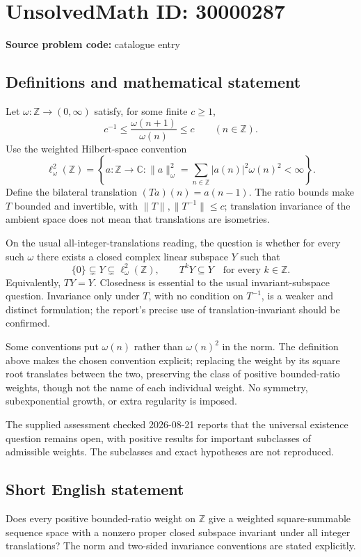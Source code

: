 \documentclass[11pt]{article}
\newcommand{\Z}{\mathbb{Z}}
\newcommand{\C}{\mathbb{C}}
\begin{document}
\section*{UnsolvedMath ID: 30000287}
\textbf{Source problem code:} catalogue entry
\subsection{Definitions and mathematical statement}
Let \(\omega:\Z\to(0,\infty)\) satisfy, for some finite \(c\geq1\),
\[
c^{-1}\leq\frac{\omega(n+1)}{\omega(n)}\leq c\qquad(n\in\Z).
\]
Use the weighted Hilbert-space convention
\[
\ell^2_\omega(\Z)=\left\{a:\Z\to\C:\|a\|_\omega^2=\sum_{n\in\Z}|a(n)|^2\omega(n)^2<\infty\right\}.
\]
Define the bilateral translation \((Ta)(n)=a(n-1)\). The ratio bounds make \(T\) bounded and invertible, with \(\|T\|,\|T^{-1}\|\leq c\); translation invariance of the ambient space does not mean that translations are isometries.

On the usual all-integer-translations reading, the question is whether for every such \(\omega\) there exists a closed complex linear subspace \(Y\) such that
\[
\{0\}\subsetneq Y\subsetneq\ell^2_\omega(\Z),\qquad
T^kY\subseteq Y\quad\text{for every }k\in\Z.
\]
Equivalently, \(TY=Y\). Closedness is essential to the usual invariant-subspace question. Invariance only under \(T\), with no condition on \(T^{-1}\), is a weaker and distinct formulation; the report's precise use of translation-invariant should be confirmed.

Some conventions put \(\omega(n)\) rather than \(\omega(n)^2\) in the norm. The definition above makes the chosen convention explicit; replacing the weight by its square root translates between the two, preserving the class of positive bounded-ratio weights, though not the name of each individual weight. No symmetry, subexponential growth, or extra regularity is imposed.

The supplied assessment checked 2026-08-21 reports that the universal existence question remains open, with positive results for important subclasses of admissible weights. The subclasses and exact hypotheses are not reproduced.
\subsection{Short English statement}
Does every positive bounded-ratio weight on \(\Z\) give a weighted square-summable sequence space with a nonzero proper closed subspace invariant under all integer translations? The norm and two-sided invariance conventions are stated explicitly.
\end{document}
